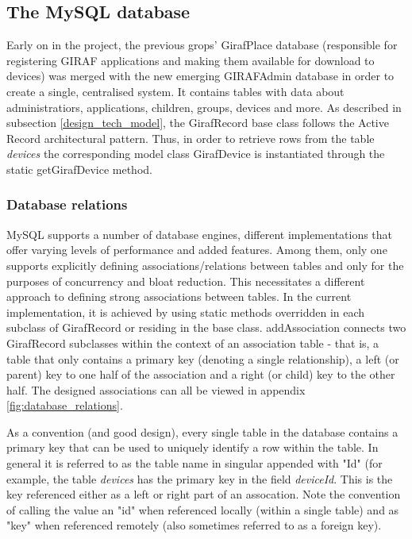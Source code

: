 \subsection{The MySQL database}
Early on in the project, the previous grops' GirafPlace database (responsible for registering GIRAF applications and making them available for download to devices) was merged with the new emerging GIRAFAdmin database in order to create a single, centralised system. It contains tables with data about administratiors, applications, children, groups, devices and more.
As described in subsection \vref{design_tech_model}, the GirafRecord base class follows the Active Record architectural pattern. Thus, in order to retrieve rows from the table \emph{devices} the corresponding model class GirafDevice is instantiated through the static getGirafDevice method.

\subsubsection{Database relations}
MySQL supports a number of database engines, different implementations that offer varying levels of performance and added features. Among them, only one supports explicitly defining associations/relations between tables and only for the purposes of concurrency and bloat reduction. This necessitates a different approach to defining strong associations between tables. In the current implementation, it is achieved by using static methods overridden in each subclass of GirafRecord or residing in the base class.
addAssociation connects two GirafRecord subclasses within the context of an association table - that is, a table that only contains a primary key (denoting a single relationship), a left (or parent) key to one half of the association and a right (or child) key to the other half. The designed associations can all be viewed in appendix \vref{fig:database_relations}.

As a convention (and good design), every single table in the database contains a primary key that can be used to uniquely identify a row within the table. In general it is referred to as the table name in singular appended with "Id" (for example, the table \emph{devices} has the primary key in the field \emph{deviceId}. This is the key referenced either as a left or right part of an assocation. Note the convention of calling the value an "id" when referenced locally (within a single table) and as "key" when referenced remotely (also sometimes referred to as a foreign key).

